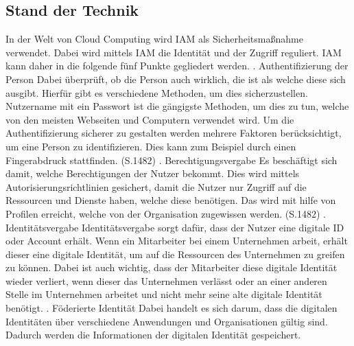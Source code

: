 \subsection{Stand der Technik}
\label{sec:chapter04:Stand}
In der Welt von Cloud Computing wird \ac{IAM} als Sicherheitsmaßnahme verwendet.
Dabei wird mittels \ac{IAM} die Identität und der Zugriff reguliert.
\ac{IAM} kann daher in die folgende fünf Punkte gegliedert werden.
\newline
{}. Authentifizierung der Person
\newline
Dabei überprüft, ob die Person auch wirklich, die ist als welche diese sich ausgibt.
Hierfür gibt es verschiedene Methoden, um dies sicherzustellen.
Nutzername mit ein Passwort ist die gängigste Methoden, um dies zu tun, welche von den meisten Webseiten und Computern verwendet wird.
Um die Authentifizierung sicherer zu gestalten werden mehrere Faktoren berücksichtigt, um eine Person zu identifizieren.
Dies kann zum Beispiel durch einen Fingerabdruck stattfinden. \cite{IamIEEE} (S.1482)
\newline
{}. Berechtigungsvergabe
\newline
Es beschäftigt sich damit, welche Berechtigungen der Nutzer bekommt.
Dies wird mittels Autorisierungsrichtlinien gesichert, damit die Nutzer nur Zugriff auf die Ressourcen und Dienste haben, welche diese benötigen.
Das wird mit hilfe von Profilen erreicht, welche von der Organisation zugewissen werden. \cite{IamIEEE} (S.1482)
\newline
{}. Identitätsvergabe
\newline
Identitätsvergabe sorgt dafür, dass der Nutzer eine digitale ID oder Account erhält.
Wenn ein Mitarbeiter bei einem Unternehmen arbeit, erhält dieser eine digitale Identität, um auf die Ressourcen des Unternehmen zu greifen zu können.
Dabei ist auch wichtig, dass der Mitarbeiter diese digitale Identität wieder verliert, wenn dieser das Unternehmen verlässt oder an einer anderen Stelle im Unternehmen arbeitet und nicht mehr seine alte digitale Identität benötigt.
\newline
{}. Föderierte Identität
\newline
Dabei handelt es sich darum, dass die digitalen Identitäten über verschiedene Anwendungen und Organisationen gültig sind.
Dadurch werden die Informationen der digitalen Identität gespeichert.
